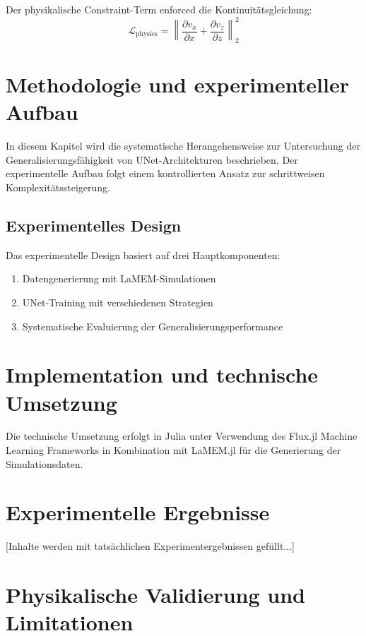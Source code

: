 \documentclass[12pt,twoside,openright]{scrreprt}
\theoremstyle{definition}
\theoremstyle{plain}
\begin{document}
	Der physikalische Constraint-Term enforced die Kontinuitätsgleichung:
	\begin{equation}
		\mathcal{L}_{\text{physics}} = \left\| \frac{\partial v_x}{\partial x} + \frac{\partial v_z}{\partial z} \right\|_2^2
	\end{equation}
	

	
	\chapter{Methodologie und experimenteller Aufbau}
	\label{ch:methodology}
	
	In diesem Kapitel wird die systematische Herangehensweise zur Untersuchung der Generalisierungsfähigkeit von UNet-Architekturen beschrieben. Der experimentelle Aufbau folgt einem kontrollierten Ansatz zur schrittweisen Komplexitätssteigerung.
	
	\section{Experimentelles Design}
	
	Das experimentelle Design basiert auf drei Hauptkomponenten:
	\begin{enumerate}
		\item Datengenerierung mit LaMEM-Simulationen
		\item UNet-Training mit verschiedenen Strategien
		\item Systematische Evaluierung der Generalisierungsperformance
	\end{enumerate}
	
	\chapter{Implementation und technische Umsetzung}
	\label{ch:implementation}
	
	Die technische Umsetzung erfolgt in Julia unter Verwendung des Flux.jl Machine Learning Frameworks in Kombination mit LaMEM.jl für die Generierung der Simulationsdaten.
	
	\chapter{Experimentelle Ergebnisse}
	\label{ch:results}
	
	[Inhalte werden mit tatsächlichen Experimentergebnissen gefüllt...]
	
	\chapter{Physikalische Validierung und Limitationen}
	\label{ch:validation}
	
\end{document}
